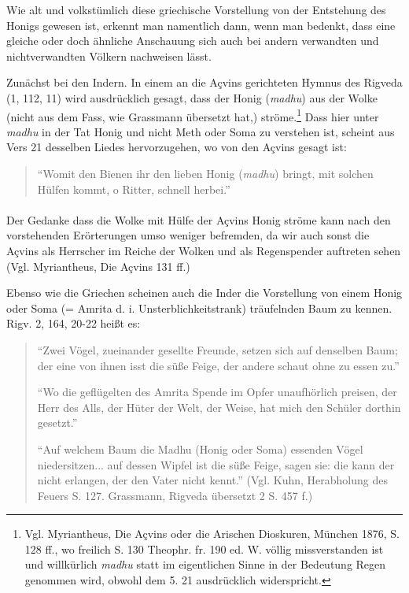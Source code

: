 \documentclass[a4paper, 11pt, oneside]{article}
\begin{document}
Wie alt und volkstümlich diese griechische Vorstellung von der Entstehung des Honigs gewesen ist, erkennt man namentlich dann, wenn man bedenkt, dass eine gleiche oder doch ähnliche Anschauung sich auch bei andern verwandten und nichtverwandten Völkern nachweisen lässt.

Zunächst bei den Indern. In einem an die Açvins gerichteten Hymnus des Rigveda (1, 112, 11) wird ausdrücklich gesagt, dass der Honig (\emph{madhu}) aus der Wolke (nicht aus dem Fass, wie Grassmann übersetzt hat,) ströme.\footnote{Vgl. Myriantheus, Die Açvins oder die Arischen Dioskuren, München 1876, S. 128 ff., wo freilich S. 130 Theophr. fr. 190 ed. W. völlig missverstanden ist und willkürlich \emph{madhu} statt im eigentlichen Sinne in der Bedeutung Regen genommen wird, obwohl dem 5. 21 ausdrücklich widerspricht.} Dass hier unter \emph{madhu} in der Tat Honig und nicht Meth oder Soma zu verstehen ist, scheint aus Vers 21 desselben Liedes hervorzugehen, wo von den Açvins gesagt ist:
\begin{quotation}\large
"`Womit den Bienen ihr den lieben Honig (\emph{madhu}) bringt, mit solchen Hülfen kommt, o Ritter, schnell herbei."'
\end{quotation}
\paragraph{}
Der Gedanke dass die Wolke mit Hülfe der Açvins Honig ströme kann nach den vorstehenden Erörterungen umso weniger befremden, da wir auch sonst die Açvins als Herrscher im Reiche der Wolken und als Regenspender auftreten sehen (Vgl. Myriantheus, Die Açvins 131 ff.)

Ebenso wie die Griechen scheinen auch die Inder die Vorstellung von einem Honig oder Soma (= Amrita d. i. Unsterblichkeitstrank) träufelnden Baum zu kennen. Rigv. 2, 164, 20-22 heißt es:
\begin{quotation}\large
"`Zwei Vögel, zueinander gesellte Freunde, setzen sich auf denselben Baum; der eine von ihnen isst die süße Feige, der andere schaut ohne zu essen zu."'

"`Wo die geflügelten des Amrita Spende im Opfer unaufhörlich preisen, der Herr des Alls, der Hüter der Welt, der Weise, hat mich den Schüler dorthin gesetzt."'

"`Auf welchem Baum die Madhu (Honig oder Soma) essenden Vögel niedersitzen... auf dessen Wipfel ist die süße Feige, sagen sie: die kann der nicht erlangen, der den Vater nicht kennt."' (Vgl. Kuhn, Herabholung des Feuers S. 127. Grassmann, Rigveda übersetzt 2 S. 457 f.)
\end{quotation}
\end{document}
